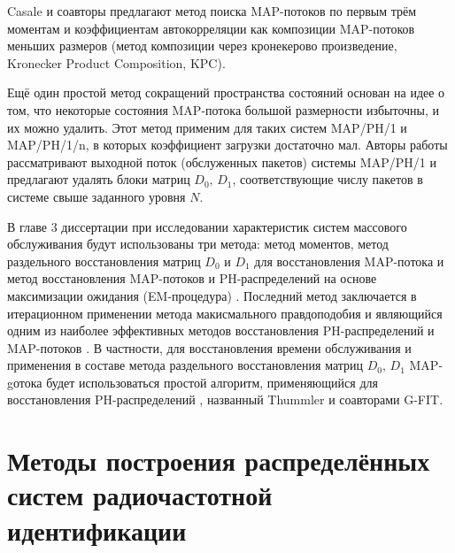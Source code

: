Casale и соавторы \cite{2010_Casale_Zhang_Smirni} предлагают метод поиска MAP-потоков по первым трём моментам и коэффициентам автокорреляции как композиции MAP-потоков меньших размеров (метод композиции через кронекерово произведение, Kronecker Product Composition, KPC).

Ещё один простой метод сокращений пространства состояний основан на идее о том, что некоторые состояния MAP-потока большой размерности избыточны, и их можно удалить. Этот метод применим для таких систем MAP/PH/1 и MAP/PH/1/n, в которых коэффициент загрузки достаточно мал. Авторы работы \cite{2010_Horvath_Horvath_Telek} рассматривают выходной поток (обслуженных пакетов) системы MAP/PH/1 и предлагают удалять блоки матриц $D_0,\,D_1$, соответствующие числу пакетов в системе свыше заданного уровня $N$.

В главе 3 диссертации при исследовании характеристик систем массового обслуживания будут использованы три метода: метод моментов, метод раздельного восстановления матриц $D_0$ и $D_1$ для восстановления MAP-потока \cite{2005-Horvath_Buccholz_Telek} и метод восстановления MAP-потоков и PH-распределений на основе максимизации ожидания (EM-процедура) \cite{2016-Horvath-etal,2005-Bobbio-Horvath-Telek,2005_Thummler_Buchholz_Telek}. Последний метод заключается в итерационном применении метода макисмального правдоподобия и являющийся одним из наиболее эффективных методов восстановления PH-распределений \cite{2005_Thummler_Buchholz_Telek} и MAP-потоков \cite{2013_Horvath_Okamura,2009_Okamura_Dohi}. В частности, для восстановления времени обслуживания и применения в составе метода раздельного восстановления матриц $D_0,\,D_1$ MAP-gотока будет использоваться простой алгоритм, применяющийся для восстановления PH-распределений \cite{2005_Thummler_Buchholz_Telek}, названный Thummler и соавторами G-FIT.




\section{Методы построения распределённых систем радиочастотной идентификации}

